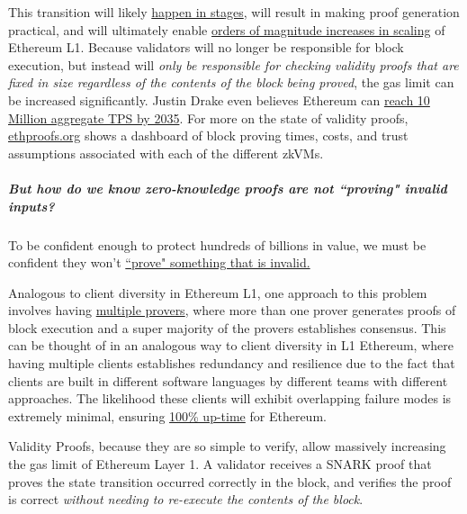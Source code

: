 \documentclass[12pt]{article}
\begin{document}
This transition will likely \href{https://vitalik.eth.limo/general/2025/05/03/simplel1.html#:~:text=the%20following%20process%20for%20a%20VM%20change}{happen in stages}, will result in making proof generation practical, and will ultimately enable \href{https://x.com/0xJaehaerys/status/1944859201291083887}{orders of magnitude increases in scaling} of Ethereum L1. Because validators will no longer be responsible for block execution, but instead will \textit{only be responsible for checking validity proofs that are fixed in size regardless of the contents of the block being proved}, the gas limit can be increased significantly. Justin Drake even believes Ethereum can \href{https://www.youtube.com/watch?v=yvP39-EOADU}{reach 10 Million aggregate TPS by 2035}. For more on the state of validity proofs, \href{https://ethproofs.org/}{ethproofs.org} shows a dashboard of block proving times, costs, and trust assumptions associated with each of the different zkVMs.

\subparagraph{But how do we know zero-knowledge proofs are not ``proving" invalid inputs?} To be confident enough to protect hundreds of billions in value, we must be confident they won't \href{https://blog.lambdaclass.com/responsible-disclosure-of-an-exploit-in-succincts-sp1-zkvm-found-in-partnership-with-3mi-labs-and-aligned-which-arises-from-the-interaction-of-two-distinct-security-vulnerabilities/}{``prove" something that is invalid.} 

Analogous to client diversity in Ethereum L1, one approach to this problem involves having \href{https://www.youtube.com/watch?v=6hfVzCWT6YI}{multiple provers}, where more than one prover generates proofs of block execution and a super majority of the provers establishes consensus. This can be thought of in an analogous way to client diversity in L1 Ethereum, where having multiple clients establishes redundancy and resilience due to the fact that clients are built in different software languages by different teams with different approaches. The likelihood these clients will exhibit overlapping failure modes is extremely minimal, ensuring \href{https://ethereumuptime.org/}{100\% up-time} for Ethereum. 

Validity Proofs, because they are so simple to verify, allow massively increasing the gas limit of Ethereum Layer 1. A validator receives a SNARK proof that proves the state transition occurred correctly in the block, and verifies the proof is correct \textit{without needing to re-execute the contents of the block}.  
\end{document}
